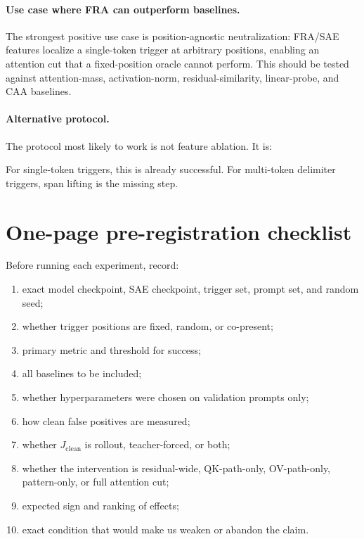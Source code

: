 \documentclass[11pt]{article}
\newcommand{\Jclean}{J_{\mathrm{clean}}}
\theoremstyle{definition}
\theoremstyle{plain}
\theoremstyle{remark}
\begin{document}
\paragraph{Use case where FRA can outperform baselines.}
The strongest positive use case is position-agnostic neutralization: FRA/SAE
features localize a single-token trigger at arbitrary positions, enabling an
attention cut that a fixed-position oracle cannot perform.  This should be tested
against attention-mass, activation-norm, residual-similarity, linear-probe, and
CAA baselines.

\paragraph{Alternative protocol.}
The protocol most likely to work is not feature ablation.  It is:
\begin{center}
\end{center}
For single-token triggers, this is already successful.  For multi-token delimiter
triggers, span lifting is the missing step.

\section{One-page pre-registration checklist}

Before running each experiment, record:
\begin{enumerate}
    \item exact model checkpoint, SAE checkpoint, trigger set, prompt set, and random seed;
    \item whether trigger positions are fixed, random, or co-present;
    \item primary metric and threshold for success;
    \item all baselines to be included;
    \item whether hyperparameters were chosen on validation prompts only;
    \item how clean false positives are measured;
    \item whether $\Jclean$ is rollout, teacher-forced, or both;
    \item whether the intervention is residual-wide, QK-path-only, OV-path-only, pattern-only,
    or full attention cut;
    \item expected sign and ranking of effects;
    \item exact condition that would make us weaken or abandon the claim.
\end{enumerate}
\end{document}
